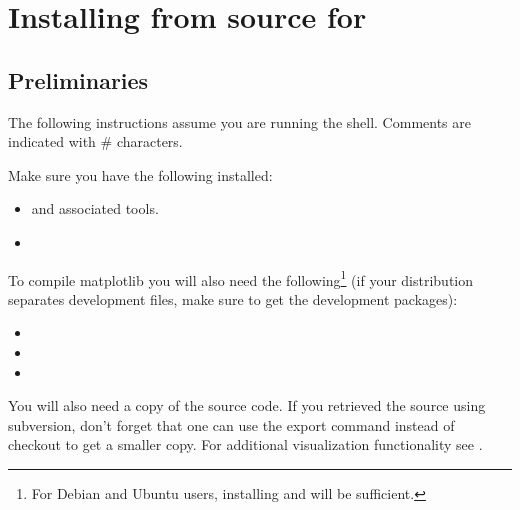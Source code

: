 %
%
%

\section{Installing from source for \linux}
\label{sec:srclinux}

\subsection{Preliminaries}

The following instructions assume you are running the  shell.
Comments are indicated with \# characters.

Make sure you have the following installed:
\begin{itemize}
 \item {} and associated tools.
 \item {}
\end{itemize}

To compile matplotlib you will also need the following\footnote{For Debian and Ubuntu users, installing  and  will be sufficient.} (if your distribution separates development files,
make sure to get the development packages):
\begin{itemize}
 \item {}
\item {}
\item {}
\end{itemize}



You will also need a copy of the \esfinley source code.
If you retrieved the source using subversion, don't forget that one can use the export command instead of checkout to get a smaller copy.
For additional visualization functionality see .


